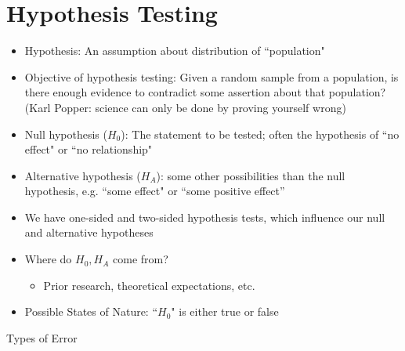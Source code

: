 \documentclass[10pt, oneside]{article}
\begin{document}
\section{Hypothesis Testing}
\begin{itemize}
    \item Hypothesis: An assumption about distribution of ``population"
    \item Objective of hypothesis testing: Given a random sample from a population, is there enough evidence to contradict some assertion about that population? (Karl Popper: science can only be done by proving yourself wrong)
    \item Null hypothesis ($H_0$): The statement to be tested; often the hypothesis of ``no effect" or ``no relationship"
    \item Alternative hypothesis ($H_A$): some other possibilities than the null hypothesis, e.g. ``some effect" or ``some positive effect''
    \item We have one-sided and two-sided hypothesis tests, which influence our null and alternative hypotheses
    \item Where do $H_0, H_A$ come from?
    \begin{itemize}
        \item Prior research, theoretical expectations, etc.
    \end{itemize}
    \item Possible States of Nature: ``$H_0$" is either true or false
\end{itemize}
Types of Error
\vspace{0.1in}
\end{document}
